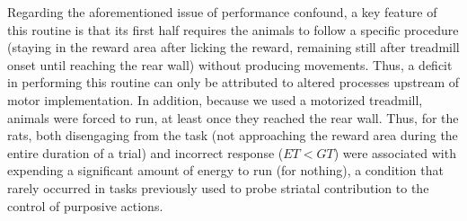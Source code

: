Regarding the aforementioned issue of performance confound, a key feature of this routine is that its first half requires the animals to follow a specific procedure (staying in the reward area after licking the reward, remaining still after treadmill onset until reaching the rear wall) without producing movements. 
Thus, a deficit in performing this routine can only be attributed to altered processes upstream of motor implementation.
In addition, because we used a motorized treadmill, animals were forced to run, at least once they reached the rear wall.
Thus, for the rats, both disengaging from the task (not approaching the reward area during the entire duration of a trial) and incorrect response ($ET<GT$) were associated with expending a significant amount of energy to run (for nothing), a condition that rarely occurred in tasks previously used to probe striatal contribution to the control of purposive actions.
\par


